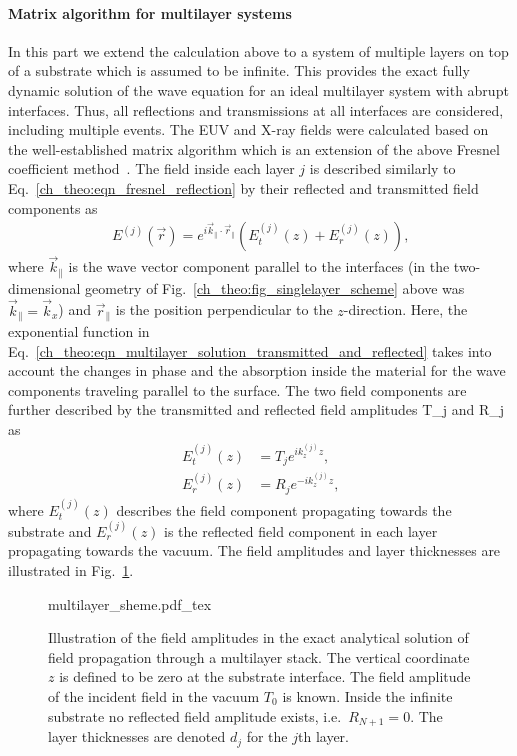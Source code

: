 \paragraph{Matrix algorithm for multilayer systems} \label{ch_theo:sec_matrix_algorithm}
In this part we extend the calculation above to a system of multiple layers on top of a substrate which is assumed to be infinite. This provides the exact fully dynamic solution of the wave equation for an ideal multilayer system with abrupt interfaces. Thus, all reflections and transmissions at all interfaces are considered, including multiple events. The EUV and X-ray fields were calculated based on the well-established matrix algorithm which is an extension of the above Fresnel coefficient method~\cite{born_principles_1965,mikulik_x-ray_1997}. The field inside each layer $j$ is described similarly to Eq.~\eqref{ch_theo:eqn_fresnel_reflection} by their reflected and transmitted field components as
\begin{align}
E^{(j)}(\vec{r}) = e^{i \vec{k}_\parallel \cdot \vec{r}_\parallel} (E_t^{(j)}(z) + E_r^{(j)}(z)) \text{,} \label{ch_theo:eqn_multilayer_solution_transmitted_and_reflected}
\end{align}
where $\vec{k}_\parallel$ is the wave vector component parallel to the interfaces (in the two-dimensional geometry of Fig.~\ref{ch_theo:fig_singlelayer_scheme} above was $\vec{k}_\parallel = \vec{k}_x$) and $\vec{r}_\parallel$ is the position perpendicular to the $z$-direction. Here, the exponential function in Eq.~\eqref{ch_theo:eqn_multilayer_solution_transmitted_and_reflected} takes into account the changes in phase and the absorption inside the material for the wave components traveling parallel to the surface. The two field components are further described by the transmitted and reflected field amplitudes \gls{T_j} and \gls{R_j} as
\begin{align}
E_t^{(j)}(z) &= T_{j} e^{i k_z^{(j)} z} \text{,} \label{ch_theo:eqn_multilayer_amplitude_transmitted} \\
E_r^{(j)}(z) &= R_{j} e^{-i k_z^{(j)} z} \text{,} \label{ch_theo:eqn_multilayer_amplitude_reflected}
\end{align}
where $E_t^{(j)}(z)$ describes the field component propagating towards the substrate and $E_r^{(j)}(z)$ is the reflected field component in each layer propagating towards the vacuum. The field amplitudes and layer thicknesses are illustrated in Fig.~\ref{ch_theo:fig_multilayer_scheme}.
\begin{figure}[htb]
    {multilayer_sheme.pdf_tex}
    \caption[Field amplitudes in the exact solution for a multilayer system.]{Illustration of the field amplitudes in the exact analytical solution of field propagation through a multilayer stack. The vertical coordinate $z$ is defined to be zero at the substrate interface. The field amplitude of the incident field in the vacuum $T_0$ is known. Inside the infinite substrate no reflected field amplitude exists, i.e.~$R_{N+1} = 0$. The layer thicknesses are denoted $d_j$ for the $j$th layer.}
    \label{ch_theo:fig_multilayer_scheme}
\end{figure}

